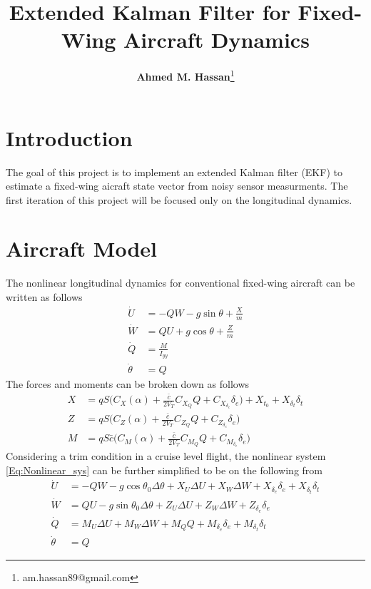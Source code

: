 \documentclass{article}
\title{\textbf{Extended Kalman Filter for Fixed-Wing Aircraft Dynamics}}
\author{\textbf{Ahmed M. Hassan}\thanks{am.hassan89@gmail.com}}
\begin{document}
\maketitle

\section{Introduction}
The goal of this project is to implement an extended Kalman filter (EKF) to estimate
a fixed-wing aicraft state vector from noisy sensor measurments. 
The first iteration of this project will be focused only on the longitudinal dynamics.
   
\section{Aircraft Model}
The nonlinear longitudinal dynamics for conventional fixed-wing aircraft can be written as follows \cite{Nelson, Stevens-Lewis}
\begin{equation}\label{Eq:Nonlinear_sys}
    \begin{split}
        \dot{U} &= -Q W - g \sin{\theta} + \frac{X}{m}\\
        \dot{W} &= Q U + g \cos{\theta} + \frac{Z}{m}\\
        \dot{Q} &= \frac{M}{I_{yy}}\\
        \dot{\theta} &= Q
    \end{split}
\end{equation}
The forces and moments can be broken down as follows
\begin{equation}
    \begin{split}
        X &= q S \biggl(C_X(\alpha) + \frac{\bar{c}}{2 V_T} C_{X_Q} Q + C_{X_{\delta_e}} \delta_e\biggr) +
        X_{t_0} + X_{\delta_t} \delta_t\\
        Z &= q S \biggl(C_Z(\alpha) + \frac{\bar{c}}{2 V_T} C_{Z_Q} Q + C_{Z_{\delta_e}} \delta_e\biggr)\\
        M &= q S \bar{c} \biggl(C_M(\alpha) + \frac{\bar{c}}{2 V_T} C_{M_Q} Q + C_{M_{\delta_e}} \delta_e \biggr)
    \end{split}
\end{equation}
Considering a trim condition in a cruise level flight, the nonlinear system \ref{Eq:Nonlinear_sys} 
can be further simplified to be on the following from
\begin{equation}\label{Eq:Nonlinear_sys_cruise}
    \begin{split}
        \dot{U} &= -Q W - g \cos{\theta_0} \Delta \theta+ X_U \Delta U + X_W \Delta W +
                 X_{\delta_e} \delta_e + X_{\delta_t} \delta_t\\
        \dot{W} &= Q U - g \sin{\theta_0} \Delta \theta + Z_U \Delta U + Z_W \Delta W + Z_{\delta_e} \delta_e\\
        \dot{Q} &= M_U \Delta U + M_W \Delta W + M_Q Q + M_{\delta_e} \delta_e + M_{\delta_t} \delta_t\\
        \dot{\theta} &= Q
    \end{split}
\end{equation}
\end{document}
